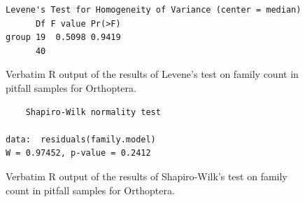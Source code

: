 \documentclass[10pt,letterpaper,twocolumn]{article}
\begin{document}
\begin{figure}[h]
	\lstset{numbers=left}
	\lstset{xleftmargin=5mm,framexleftmargin=5mm}
	\begin{lstlisting}
Levene's Test for Homogeneity of Variance (center = median)
      Df F value Pr(>F)
group 19  0.5098 0.9419
      40               
	\end{lstlisting}
	\caption{Verbatim R output of the results of Levene's test on family count in pitfall samples for Orthoptera.}
	\label{fig:pitfall_orthoptera_family_levene}
	\smallskip
	\nointerlineskip
	\hrulefill
\end{figure}

\begin{figure}[h]
	\lstset{numbers=left}
	\lstset{xleftmargin=5mm,framexleftmargin=5mm}
	\begin{lstlisting}
	Shapiro-Wilk normality test

data:  residuals(family.model)
W = 0.97452, p-value = 0.2412
	\end{lstlisting}
	\caption{Verbatim R output of the results of Shapiro-Wilk's test on family count in pitfall samples for Orthoptera.}
	\label{fig:pitfall_orthoptera_family_shapiro}
	\smallskip
	\nointerlineskip
	\hrulefill
\end{figure}
\end{document}
